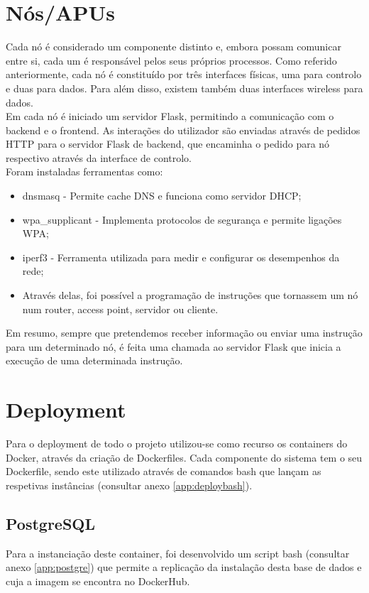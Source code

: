 \section{Nós/APUs}
Cada nó é considerado um componente distinto e, embora possam comunicar entre si, cada um é responsável pelos seus próprios processos. Como referido anteriormente, cada nó é constituído por três interfaces físicas, uma para controlo e duas para dados. Para além disso, existem também duas interfaces wireless para dados.\newline\\
Em cada nó é iniciado um servidor Flask, permitindo a comunicação com o backend e o frontend. As interações do utilizador são enviadas através de pedidos HTTP para o servidor Flask de backend, que encaminha o pedido para nó respectivo através da interface de controlo.\newline\\
Foram instaladas ferramentas como:
\begin{itemize}
    \item dnsmasq - Permite cache DNS e funciona como servidor DHCP;
    \item wpa\_supplicant - Implementa protocolos de segurança e permite ligações WPA;
    \item iperf3 - Ferramenta utilizada para medir e configurar os desempenhos da rede;
    \item Através delas, foi possível a programação de instruções que tornassem um nó num router, access point, servidor ou cliente.
\end{itemize}
Em resumo, sempre que pretendemos receber informação ou enviar uma instrução para um determinado nó, é feita uma chamada ao servidor Flask que inicia a execução de uma determinada instrução. 

\section{Deployment}
Para o  deployment de todo o projeto utilizou-se como  recurso os containers do Docker, através da criação de Dockerfiles. Cada componente do sistema tem o seu Dockerfile, sendo este utilizado através de comandos bash que lançam as respetivas instâncias (consultar anexo \ref{app:deploybash}).

\subsection{PostgreSQL}
Para a instanciação deste container, foi desenvolvido um script bash (consultar anexo \ref{app:postgre}) que permite a replicação da instalação desta base de dados e cuja a imagem se encontra no DockerHub.

